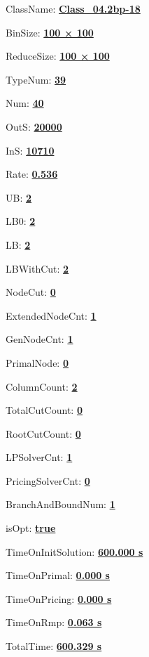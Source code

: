 \documentclass[11pt]{article}
\begin{document}
\pagestyle{empty}


ClassName: \underline{\textbf{Class_04.2bp-18}}
\par
BinSize: \underline{\textbf{100 × 100}}
\par
ReduceSize: \underline{\textbf{100 × 100}}
\par
TypeNum: \underline{\textbf{39}}
\par
Num: \underline{\textbf{40}}
\par
OutS: \underline{\textbf{20000}}
\par
InS: \underline{\textbf{10710}}
\par
Rate: \underline{\textbf{0.536}}
\par
UB: \underline{\textbf{2}}
\par
LB0: \underline{\textbf{2}}
\par
LB: \underline{\textbf{2}}
\par
LBWithCut: \underline{\textbf{2}}
\par
NodeCut: \underline{\textbf{0}}
\par
ExtendedNodeCnt: \underline{\textbf{1}}
\par
GenNodeCnt: \underline{\textbf{1}}
\par
PrimalNode: \underline{\textbf{0}}
\par
ColumnCount: \underline{\textbf{2}}
\par
TotalCutCount: \underline{\textbf{0}}
\par
RootCutCount: \underline{\textbf{0}}
\par
LPSolverCnt: \underline{\textbf{1}}
\par
PricingSolverCnt: \underline{\textbf{0}}
\par
BranchAndBoundNum: \underline{\textbf{1}}
\par
isOpt: \underline{\textbf{true}}
\par
TimeOnInitSolution: \underline{\textbf{600.000 s}}
\par
TimeOnPrimal: \underline{\textbf{0.000 s}}
\par
TimeOnPricing: \underline{\textbf{0.000 s}}
\par
TimeOnRmp: \underline{\textbf{0.063 s}}
\par
TotalTime: \underline{\textbf{600.329 s}}
\par
\newpage
\end{document}
